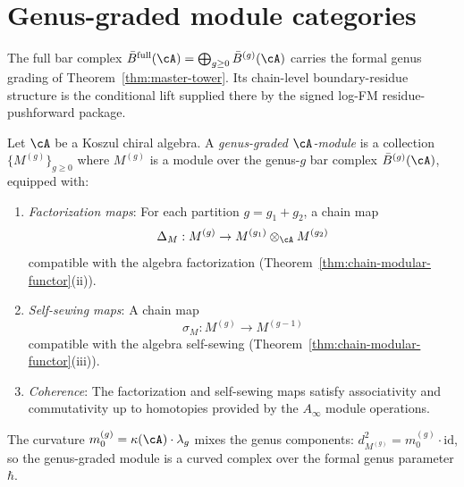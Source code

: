 \section{Genus-graded module categories}\label{sec:genus-graded-modules}

The full bar complex $\bar{B}^{\mathrm{full}}(\cA) = \bigoplus_{g \geq 0}
\bar{B}^{(g)}(\cA)$ carries the formal genus grading of
Theorem~\ref{thm:master-tower}.  Its chain-level boundary-residue
structure is the conditional lift supplied there by the signed log-FM
residue-pushforward package.

\begin{definition}\label{def:genus-graded-module}
Let $\cA$ be a Koszul chiral algebra. A \emph{genus-graded
$\cA$-module} is a collection $\{M^{(g)}\}_{g \geq 0}$ where
$M^{(g)}$ is a module over the genus-$g$ bar complex
$\bar{B}^{(g)}(\cA)$, equipped with:
\begin{enumerate}[label=\textup{(\roman*)}]
\item \emph{Factorization maps}: For each partition $g = g_1 + g_2$,
 a chain map
 \begin{equation}\label{eq:module-factorization}
 \Delta_M: M^{(g)} \to M^{(g_1)} \otimes_{\cA} M^{(g_2)}
 \end{equation}
 compatible with the algebra factorization
 (Theorem~\ref{thm:chain-modular-functor}(ii)).
\item \emph{Self-sewing maps}: A chain map
 \begin{equation}\label{eq:module-self-sewing}
 \sigma_M: M^{(g)} \to M^{(g-1)}
 \end{equation}
 compatible with the algebra self-sewing
 (Theorem~\ref{thm:chain-modular-functor}(iii)).
\item \emph{Coherence}: The factorization and self-sewing maps
 satisfy associativity and commutativity up to homotopies
 provided by the $A_\infty$ module operations.
\end{enumerate}

The curvature $m_0^{(g)} = \kappa(\cA) \cdot \lambda_g$ mixes
the genus components: $d_{M^{(g)}}^2 = m_0^{(g)} \cdot \mathrm{id}$,
so the genus-graded module is a curved complex over the formal
genus parameter $\hbar$.
\end{definition}

